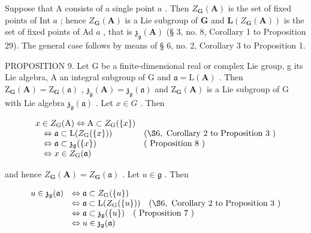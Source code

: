 Suppose that A consists of a single point \(a\) . Then \(Z_{\mathbf{G}}(\mathbf{A})\) is the set of fixed points of Int \(a\) ; hence \(Z_{\mathbf{G}}(\mathbf{A})\) is a Lie subgroup of \(\mathbf{G}\) and \(\mathbf{L}(Z_{\mathbf{G}}(\mathbf{A}))\) is the set of fixed points of Ad \(a\) , that is \(\mathfrak{z}_{\mathfrak{g}}(\mathbf{A})\) (§ 3, no. 8, Corollary 1 to Proposition 29). The general case follows by means of § 6, no. 2, Corollary 3 to Proposition 1.

PROPOSITION 9. Let G be a finite-dimensional real or complex Lie group, g its Lie algebra, A an integral subgroup of G and \(\mathfrak{a} = \mathrm{L}(\mathbf{A})\) . Then \(\mathrm{Z}_{\mathbf{G}}(\mathbf{A}) = \mathrm{Z}_{\mathbf{G}}(\mathfrak{a})\) , \(\mathfrak{z}_{\mathfrak{g}}(\mathbf{A}) = \mathfrak{z}_{\mathfrak{g}}(\mathfrak{a})\) and \(\mathrm{Z}_{\mathbf{G}}(\mathbf{A})\) is a Lie subgroup of G with Lie algebra \(\mathfrak{z}_{\mathfrak{g}}(\mathfrak{a})\) . Let \(x \in G\) . Then

\[
\begin{array}{l l} x \in Z _ {\mathrm{G}} (\mathrm{A}) \Leftrightarrow \mathrm{A} \subset Z _ {\mathrm{G}} (\{x \}) \\ \quad \Leftrightarrow \mathfrak {a} \subset \mathrm{L} (Z _ {\mathrm{G}} (\{x \})) & (\S 6, \text { Corollary   2   to   Proposition   3 }) \\ \quad \Leftrightarrow \mathfrak {a} \subset \mathfrak {z}_ {\mathfrak {g}} (\{x \}) & (\text { Proposition   8 }) \\ \quad \Leftrightarrow x \in Z _ {\mathrm{G}} (\mathfrak {a}) \end{array}
\]

and hence \(Z_{\mathbf{G}}(\mathbf{A}) = Z_{\mathbf{G}}(\mathfrak{a})\) . Let \(u \in \mathfrak{g}\) . Then

\[
\begin{array}{r l} u \in \mathfrak{z}_{\mathfrak{g}}(\mathfrak{a}) & \Leftrightarrow \mathfrak{a} \subset Z_{\mathrm{G}} (\{u\}) \\ & \Leftrightarrow \mathfrak{a} \subset \mathrm{L} (Z_{\mathrm{G}} (\{u\})) \quad (\S 6, \text { Corollary   2   to   Proposition   3 }) \\ & \Leftrightarrow \mathfrak{a} \subset \mathfrak{z}_{\mathfrak{g}} (\{u\}) \quad (\text { Proposition   7 }) \\ & \Leftrightarrow u \in \mathfrak{z}_{\mathfrak{g}} (\mathfrak{a}) \end{array}
\]

